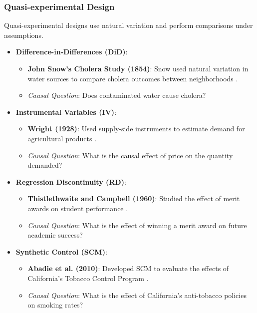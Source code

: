 \documentclass[xcolor=svgnames,t]{beamer}
\begin{document}
\begin{frame}
    \frametitle{Quasi-experimental Design}
    
    \small %
    Quasi-experimental designs use natural variation and perform comparisons under assumptions.
    \pause 
    \begin{itemize}
        \item \textbf{Difference-in-Differences (DiD)}: 
        \begin{itemize}
            \item \textbf{John Snow's Cholera Study (1854)}: Snow used natural variation in water sources to compare cholera outcomes between neighborhoods \citep{snow1854}.
            \item \textit{Causal Question}: Does contaminated water cause cholera?
        \end{itemize}
        
        \pause %
        \item \textbf{Instrumental Variables (IV)}: 
        \begin{itemize}
            \item \textbf{Wright (1928)}: Used supply-side instruments to estimate demand for agricultural products \citep{wright1928}.
            \item \textit{Causal Question}: What is the causal effect of price on the quantity demanded?
        \end{itemize}
        
        \pause %
        \item \textbf{Regression Discontinuity (RD)}: 
        \begin{itemize}
            \item \textbf{Thistlethwaite and Campbell (1960)}: Studied the effect of merit awards on student performance \citep{thistlethwaite1960}.
            \item \textit{Causal Question}: What is the effect of winning a merit award on future academic success?
        \end{itemize}
        
        \pause %
        \item \textbf{Synthetic Control (SCM)}: 
        \begin{itemize}
            \item \textbf{Abadie et al. (2010)}: Developed SCM to evaluate the effects of California’s Tobacco Control Program \citep{abadie2010}.
            \item \textit{Causal Question}: What is the effect of California’s anti-tobacco policies on smoking rates?
        \end{itemize}
    \end{itemize}
\end{frame}
\end{document}
